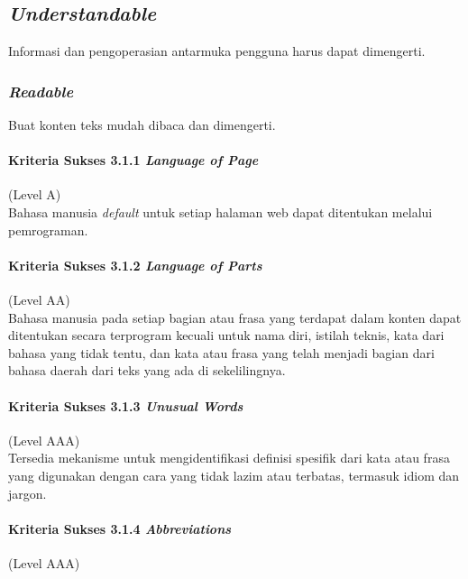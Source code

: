 \subsection{\textit{Understandable}}
\label{sec:understandable}
Informasi dan pengoperasian antarmuka pengguna harus dapat dimengerti.

\subsubsection{\textit{Readable}}
\label{sec:readable}
Buat konten teks mudah dibaca dan dimengerti.

\paragraph{Kriteria Sukses 3.1.1 \textit{Language of Page}}
\label{sec:kriteria_sukses_3.1.1}
(Level A)\\

Bahasa manusia \textit{default} untuk setiap halaman web dapat ditentukan melalui pemrograman.

\paragraph{Kriteria Sukses 3.1.2 \textit{Language of Parts}}
\label{sec:kriteria_sukses_3.1.2}
(Level AA)\\

Bahasa manusia pada setiap bagian atau frasa yang terdapat dalam konten dapat ditentukan secara terprogram kecuali untuk nama diri, istilah teknis, kata dari bahasa yang tidak tentu, dan kata atau frasa yang telah menjadi bagian dari bahasa daerah dari teks yang ada di sekelilingnya.

\paragraph{Kriteria Sukses 3.1.3 \textit{Unusual Words}}
\label{sec:kriteria_sukses_3.1.3}
(Level AAA)\\

Tersedia mekanisme untuk mengidentifikasi definisi spesifik dari kata atau frasa yang digunakan dengan cara yang tidak lazim atau terbatas, termasuk idiom dan jargon.

\paragraph{Kriteria Sukses 3.1.4 \textit{Abbreviations}}
\label{sec:kriteria_sukses_3.1.4}
(Level AAA)\\

